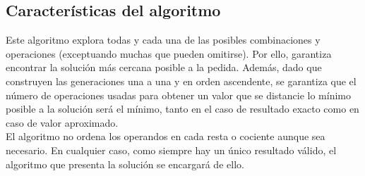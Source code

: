 \subsection{Características del algoritmo}
Este algoritmo explora todas y cada una de las posibles combinaciones y operaciones
(exceptuando muchas que pueden omitirse). Por ello, garantiza encontrar la
solución más cercana posible a la pedida. Además, dado que construyen las
generaciones una a una y en orden ascendente, se garantiza que el número de
operaciones usadas para obtener un valor que se distancie lo mínimo posible
a la solución será el mínimo, tanto en el caso de resultado exacto como en
caso de valor aproximado.\\

El algoritmo no ordena los operandos en cada resta o cociente aunque sea necesario.
En cualquier caso, como siempre hay un único resultado válido, el algoritmo
que presenta la solución se encargará de ello.
